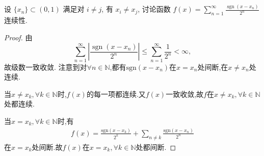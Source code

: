 \documentclass[../../main.tex]{subfiles}
\begin{document}
\begin{example}
设 $\{x_n\} \subset (0,1)$ 满足对 $i \neq j$, 有 $x_i \neq x_j$, 讨论函数 $f(x) = \sum_{n=1}^\infty \frac{\operatorname{sgn}(x - x_n)}{2^n}$ 连续性.
\end{example}
\begin{proof}
由
\[
\sum_{n=1}^\infty \left| \frac{\operatorname{sgn}(x - x_n)}{2^n} \right| \leqslant \sum_{n=1}^\infty \frac{1}{2^n} < \infty,
\]
故级数一致收敛. 注意到对$\forall n\in \mathbb{N} $,都有$\mathrm{sgn} \left( x-x_n \right) $在$x=x_n$处间断,在$x\ne x_n$处连续.

当$x\ne x_k,\forall k\in \mathbb{N} $时,$f\left( x \right) $的每一项都连续.又$f\left( x \right) $一致收敛,故$f$在$x\ne x_k,\forall k\in \mathbb{N} $处都连续.

当$x=x_k,\forall k\in \mathbb{N} $时,有
\begin{align*}
f\left( x \right) =\frac{\mathrm{sgn} \left( x-x_k \right)}{2^k}+\sum_{n\ne k}{\frac{\mathrm{sgn} \left( x-x_n \right)}{2^n}}
\end{align*}
在$x=x_k$处间断.故$f\left( x \right) $在$x=x_k,\forall k\in \mathbb{N} $处都间断.

\end{proof}
\end{document}
